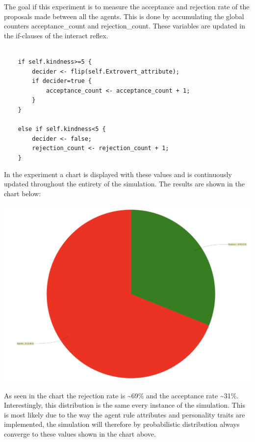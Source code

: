 \documentclass[a4paper,10pt]{article}
\begin{document}
The goal if this experiment is to measure the acceptance and rejection rate of the proposals made between all the agents. This is done by accumulating the global counters acceptance\_count and rejection\_count. These variables are updated in the if-clauses of the interact reflex. 

\begin{verbatim}

    if self.kindness>=5 {
		decider <- flip(self.Extrovert_attribute);
		if decider=true {
			acceptance_count <- acceptance_count + 1;
        }
    }
    
    else if self.kindness<5 {
	    decider <- false;
	    rejection_count <- rejection_count + 1;
    }
\end{verbatim}

In the experiment a chart is displayed with these values and is continuously updated throughout the entirety of the simulation. The results are shown in the chart below:

\begin{center}{}
\centering\includegraphics[scale=0.05]{original_exp.png}\par
\end{center}

As seen in the chart the rejection rate is \textasciitilde 69\% and the acceptance rate \textasciitilde 31\%. Interestingly, this distribution is the same every instance of the simulation. This is most likely due to the way the agent rule attributes and personality traits are implemented, the simulation will therefore by probabilistic distribution always converge to these values shown in the chart above. 
\end{document}
